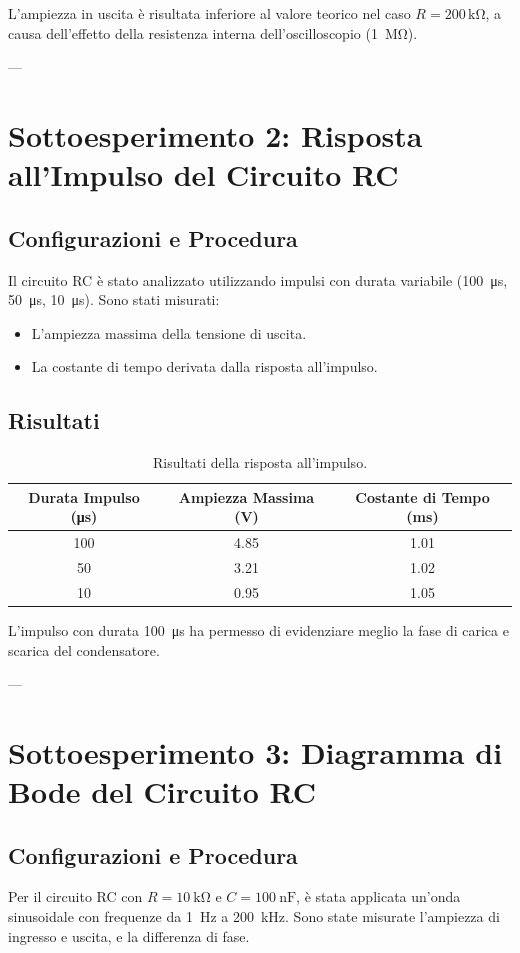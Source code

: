 \documentclass[a4paper,11pt]{article}
\begin{document}
L'ampiezza in uscita è risultata inferiore al valore teorico nel caso \( R = 200 \, \mathrm{k\Omega} \), a causa dell'effetto della resistenza interna dell'oscilloscopio (\SI{1}{\mega\ohm}).

---

\section{Sottoesperimento 2: Risposta all'Impulso del Circuito RC}
\subsection*{Configurazioni e Procedura}
Il circuito RC è stato analizzato utilizzando impulsi con durata variabile (\SI{100}{\micro\second}, \SI{50}{\micro\second}, \SI{10}{\micro\second}). Sono stati misurati:
\begin{itemize}
    \item L'ampiezza massima della tensione di uscita.
    \item La costante di tempo derivata dalla risposta all'impulso.
\end{itemize}

\subsection*{Risultati}
\begin{table}[H]
\centering
\begin{tabular}{|c|c|c|}
\hline
\textbf{Durata Impulso (\si{\micro\second})} & \textbf{Ampiezza Massima (\si{\volt})} & \textbf{Costante di Tempo (\si{\milli\second})} \\ \hline
100 & 4.85 & 1.01 \\ \hline
50 & 3.21 & 1.02 \\ \hline
10 & 0.95 & 1.05 \\ \hline
\end{tabular}
\caption{Risultati della risposta all’impulso.}
\end{table}

L'impulso con durata \SI{100}{\micro\second} ha permesso di evidenziare meglio la fase di carica e scarica del condensatore.

---

\section{Sottoesperimento 3: Diagramma di Bode del Circuito RC}
\subsection*{Configurazioni e Procedura}
Per il circuito RC con \( R = \SI{10}{\kilo\ohm} \) e \( C = \SI{100}{\nano\farad} \), è stata applicata un’onda sinusoidale con frequenze da \SI{1}{\hertz} a \SI{200}{\kilo\hertz}. Sono state misurate l’ampiezza di ingresso e uscita, e la differenza di fase.
\end{document}
